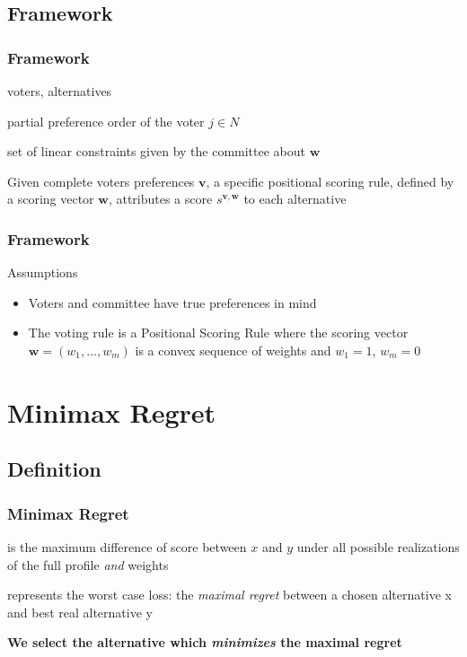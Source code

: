\documentclass{beamer}
\newcommand{\profile}{\bm{v}}%
\newcommand{\pprofile}{{\bm{p}}}%
\newcommand{\w}{\bm{w}}
\newcommand{\Co}{\mathcal{C}}
\newcommand{\ppref}{\succ^\text{p}}%
\DeclareMathOperator{\PMR}{PMR}
\DeclareMathOperator{\MR}{MR}
\begin{document}
\subsection{Framework}
\begin{frame}
	\frametitle{Framework}
	
	\begin{description}[$|N|=n, |A|=m$]
		\item[$|N|=n, |A|=m$] voters, alternatives
		\item[$\ppref_j$] partial preference order of the voter $j \in N$
		\item[$\Co_W$] set of linear  constraints given by the committee about $\w$
	\end{description}
	\medskip
	Given complete voters preferences $\profile$, a specific positional scoring rule, defined by a scoring vector $\w$, attributes a score {\color{blue} $s^{\profile, \w}$} to each alternative
\end{frame}

\begin{frame}
	\frametitle{Framework}
	\begin{block}{Assumptions}
		\begin{itemize}
			\item Voters and committee have true preferences in mind
			\item The voting rule is a Positional Scoring Rule where the scoring vector $\w=(w_1, \dots , w_m)$ is a convex sequence of weights	and $w_1=1$, $w_m=0$ 
		\end{itemize}
	\end{block}
\end{frame}

\section{Minimax Regret}
\subsection{Definition}
\begin{frame}
	\frametitle{Minimax Regret}
	\begin{description}[$\mathbf{\PMR^{\pprofile,W}(x,y)}$]
		\item[$\mathbf{\PMR^{\pprofile,W}(x,y)}$] is the maximum difference of score between $x$ and $y$ under all possible realizations of the full profile {\em and} weights
		\item[$\mathbf{\MR^{\pprofile,W}(x)}$] represents the worst case loss: the \emph{maximal regret} between a chosen alternative x and best real alternative y
	\end{description}
	\bigskip		
		\centerline{\textbf{We select the alternative which \emph{minimizes} the maximal regret}}
\end{frame}
\end{document}
